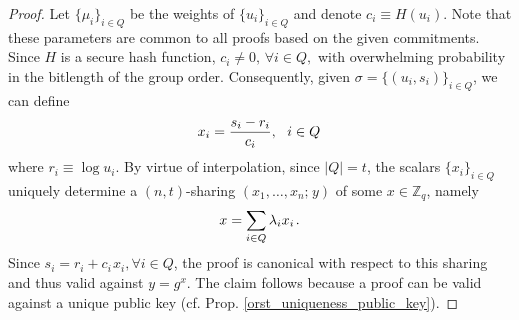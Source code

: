 \documentclass[10pt, psamsfonts, reqno]{amsart}
\theoremstyle{definition}
\theoremstyle{remark}
\numberwithin{equation}{section}
\begin{document}
\begin{proof}
Let $\{\mu_i\}_{i \in Q}$
be the weights of $\{u_i\}_{i \in Q}$
and denote $c_i \equiv H(u_i)$.
Note that these parameters
are common to all proofs based on the
given commitments.
Since $H$ is a secure hash function,
$c_i \neq 0,\hspace{2pt} \forall i \in Q,$
with overwhelming probability in
the bitlength of the group order.
Consequently, given $\sigma = \{(u_i, s_i)\}_{i \in Q}$,
we can define
\vspace{5pt}
\begin{equation*}
x_i = \frac{s_i - r_i}{c_i},
\ \ i \in Q\hspace{1pt}
\vspace{5pt}
\end{equation*}
where $r_i \equiv \log u_i$.
By virtue of interpolation,
since $|Q| = t$, the scalars $\{x_i\}_{i \in Q}$
uniquely determine a $(n, t)$-sharing
$(x_1, \dots, x_n;\hspace{1pt} y)$
of some $x \in \mathbb{Z}_q$, namely
\vspace{5pt}
\begin{equation*}
x = \sum_{i \in Q} \lambda_i x_i\hspace{1pt}.
\vspace{5pt}
\end{equation*}
Since $s_i = r_i + c_i\hspace{1pt}x_i,\forall i \in Q$,
the proof is canonical with respect to this sharing
and thus valid against $y = g ^ x$.
The claim follows because a proof can be valid
against a unique public key
(cf. Prop. \ref{orst_uniqueness_public_key}).
\end{proof}
\end{document}

